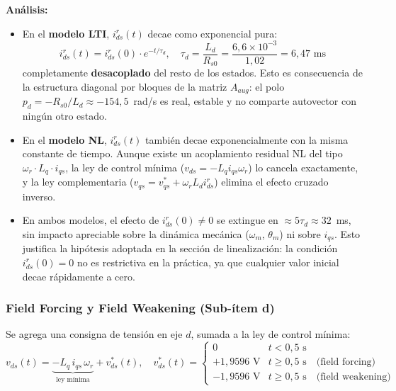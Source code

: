 \textbf{Análisis:}
\begin{itemize}
    \item En el \textbf{modelo LTI}, $i_{ds}^r(t)$ decae como exponencial pura:
    \begin{equation}
        i_{ds}^r(t) = i_{ds}^r(0) \cdot e^{-t/\tau_d}, \quad \tau_d = \frac{L_d}{R_{s0}} = \frac{6{,}6 \times 10^{-3}}{1{,}02} = 6{,}47 \text{ ms}
    \end{equation}
    completamente \textbf{desacoplado} del resto de los estados. Esto es consecuencia de la estructura diagonal por bloques de la matriz $A_{aug}$: el polo $p_d = -R_{s0}/L_d \approx -154{,}5$~rad/s es real, estable y no comparte autovector con ningún otro estado.

    \item En el \textbf{modelo NL}, $i_{ds}^r(t)$ también decae exponencialmente con la misma constante de tiempo. Aunque existe un acoplamiento residual NL del tipo $\omega_r \cdot L_q \cdot i_{qs}$, la ley de control mínima ($v_{ds} = -L_q i_{qs} \omega_r$) lo cancela exactamente, y la ley complementaria ($v_{qs} = v_{qs}^* + \omega_r L_d i_{ds}^r$) elimina el efecto cruzado inverso.

    \item En ambos modelos, el efecto de $i_{ds}^r(0) \neq 0$ se extingue en $\approx 5\tau_d \approx 32$~ms, sin impacto apreciable sobre la dinámica mecánica ($\omega_m$, $\theta_m$) ni sobre $i_{qs}$. Esto justifica la hipótesis adoptada en la sección de linealización: la condición $i_{ds}^r(0) = 0$ no es restrictiva en la práctica, ya que cualquier valor inicial decae rápidamente a cero.
\end{itemize}

\subsubsection{Field Forcing y Field Weakening (Sub-ítem d)}
\label{sec:sim_item_d}

Se agrega una consigna de tensión en eje $d$, sumada a la ley de control mínima:
\begin{equation}
    v_{ds}(t) = \underbrace{-L_q \, i_{qs} \, \omega_r}_{\text{ley mínima}} + v_{ds}^*(t), \quad
    v_{ds}^*(t) = \begin{cases}
    0 & t < 0{,}5 \text{ s} \\
    +1{,}9596 \text{ V} & t \geq 0{,}5 \text{ s} \quad \text{(field forcing)}\\
    -1{,}9596 \text{ V} & t \geq 0{,}5 \text{ s} \quad \text{(field weakening)}
    \end{cases}
\end{equation}

